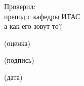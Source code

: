 \begin{titlepage}
\vspace{1em}

\begin{flushleft}
    \begin{minipage}{0.48\textwidth}
    Проверил:\\
    препод с кафедры ИТАС\\
    а как его зовут то?
    \vskip 1cm
    \begin{minipage}{0.48\textwidth}
        \centering\footnotesize
        \underline{\hspace{\textwidth}}
        (оценка)
    \end{minipage}
    \hfill
    \begin{minipage}{0.48\textwidth}
        \centering\footnotesize
        \underline{\hspace{\textwidth}}
        (подпись)
        \end{minipage}
        \vskip 1cm
        \hfill
        \begin{minipage}{0.48\textwidth}
            \centering\footnotesize
            \underline{\hspace{\textwidth}}
            (дата)
        \end{minipage}
    \end{minipage}
\end{flushleft}

\vspace{\fill}

\end{titlepage}